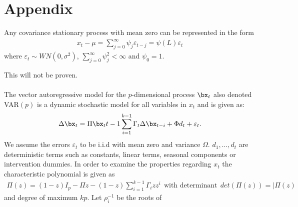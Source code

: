 \section{Appendix}
\begin{setn}[Appendix]\label{setn:Wold}
    Any covariance stationary process with mean zero can be represented in the form
    \begin{align*}
        x_t-\mu=\sum^\infty_{j=0}\psi_j\varepsilon_{t-j}=\psi(L)\varepsilon_t
    \end{align*}
    where $\varepsilon_t\sim WN(0,\sigma^2)$, $\sum^\infty_{j=0}\psi^2_j<\infty$ and $\psi_0=1$.
\end{setn}
This will not be proven.\\\\
The vector autoregressive model for the $p$-dimensional process $\bx_t$ also denoted VAR$(p)$ is a dynamic stochastic model for all variables in $x_t$ and is given as:
\begin{align*}
    \Delta\bx_t=\Pi\bx_t{t-1}\sum^{k-1}_{i=1}\Gamma_t\Delta\bx_{t-i}+\Phi d_t+\varepsilon_t.
\end{align*}
We assume the errors $\varepsilon_t$ to be i.i.d with mean zero and variance $\Omega$. $d_1,\ldots,d_t$ are deterministic terms such as constants, linear terms, seasonal components or intervention dummies. In order to examine the properties regarding $x_t$ the characteristic polynomial is given as
\begin{align*}
    \Pi(z)=(1-z)I_p-\Pi z-(1-z)\sum^{k-1}_{i=1}\Gamma_iz z^i \:\:\text{with determinant}\:\: det(\Pi(z))=|\Pi(z)
\end{align*}
and degree of maximum $kp$. Let $\rho_i^{-1}$ be the roots of 

